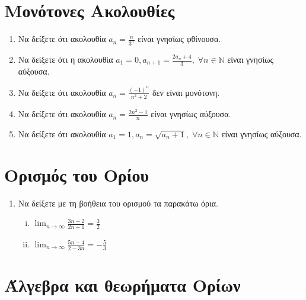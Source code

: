 \section{Μονότονες Ακολουθίες}

\begin{enumerate}
    \item Να δείξετε ότι ακολουθία $ a_{n} = \frac{n}{3^{n}} $ είναι 
        γνησίως φθίνουσα.
    \item Να δείξετε ότι η ακολουθία $ a_{1}=0, a_{n+1}= 
        \frac{2 a_{n}+4}{3}, \; \forall n \in \mathbb{N} $ είναι γνησίως αύξουσα.
    \item Να δείξετε ότι ακολουθία $ a_{n} =  \frac{(-1)^{n}}{n^{2}+2} $ 
        δεν είναι μονότονη.
    \item Να δείξετε ότι ακολουθία $ a_{n} = \frac{2n^{2}-1}{n} $ είναι γνησίως 
        αύξουσα.
    \item Να δείξετε ότι ακολουθία $ a_{1}=1, a_{n} = \sqrt{a_{n}+1}, \; 
        \forall n \in \mathbb{N}$ είναι γνησίως αύξουσα.
\end{enumerate}

\section{Ορισμός του Ορίου}

\begin{enumerate}
    \item Να δείξετε με τη βοήθεια του ορισμού τα παρακάτω όρια.
        \begin{enumerate}[i)]
            \item $ \lim_{n \to \infty} \frac{3n -2}{2n+1} = \frac{3}{2} $ 
            \item $ \lim_{n \to \infty} \frac{5n-4}{2-3n} = - \frac{5}{3} $ 
        \end{enumerate}
\end{enumerate}

\section{Άλγεβρα και θεωρήματα Ορίων}

